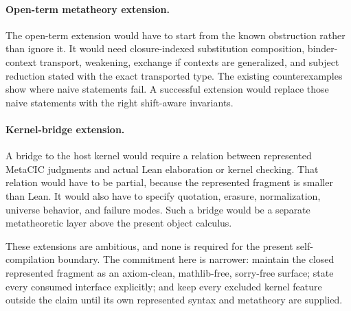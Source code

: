 \paragraph{Open-term metatheory extension.}
The open-term extension would have to start from the known obstruction rather
than ignore it.  It would need closure-indexed substitution composition,
binder-context transport, weakening, exchange if contexts are generalized,
and subject reduction stated with the exact transported type.  The existing
counterexamples show where naive statements fail.  A successful extension
would replace those naive statements with the right shift-aware invariants.

\paragraph{Kernel-bridge extension.}
A bridge to the host kernel would require a relation between represented
MetaCIC judgments and actual Lean elaboration or kernel checking.  That
relation would have to be partial, because the represented fragment is
smaller than Lean.  It would also have to specify quotation, erasure,
normalization, universe behavior, and failure modes.  Such a bridge would be
a separate metatheoretic layer above the present object calculus.

These extensions are ambitious, and none is required for the present
self-compilation boundary.  The commitment here is narrower: maintain the
closed represented fragment as an axiom-clean, mathlib-free, sorry-free
surface; state every consumed interface explicitly; and keep every excluded
kernel feature outside the claim until its own represented syntax and
metatheory are supplied.
